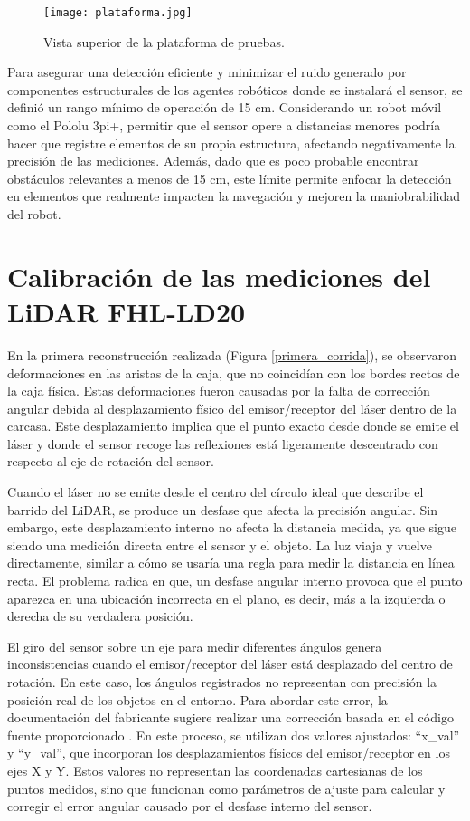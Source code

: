 \begin{figure}[H]
	\centering
	\texttt{[image: plataforma.jpg]}
	\caption{Vista superior de la plataforma de pruebas.}
	\label{fig:plataforma_fisica}
\end{figure}

Para asegurar una detección eficiente y minimizar el ruido generado por componentes estructurales de los agentes robóticos donde se instalará el sensor, se definió un rango mínimo de operación de 15 cm. Considerando un robot móvil como el Pololu 3pi+, permitir que el sensor opere a distancias menores podría hacer que registre elementos de su propia estructura, afectando negativamente la precisión de las mediciones. Además, dado que es poco probable encontrar obstáculos relevantes a menos de 15 cm, este límite permite enfocar la detección en elementos que realmente impacten la navegación y mejoren la maniobrabilidad del robot.

\section{Calibración de las mediciones del LiDAR FHL-LD20}
\label{sec:calibracion}

En la primera reconstrucción realizada (Figura \ref{primera_corrida}), se observaron deformaciones en las aristas de la caja, que no coincidían con los bordes rectos de la caja física. Estas deformaciones fueron causadas por la falta de corrección angular debida al desplazamiento físico del emisor/receptor del láser dentro de la carcasa. Este desplazamiento implica que el punto exacto desde donde se emite el láser y donde el sensor recoge las reflexiones está ligeramente descentrado con respecto al eje de rotación del sensor.

Cuando el láser no se emite desde el centro del círculo ideal que describe el barrido del LiDAR, se produce un desfase que afecta la precisión angular. Sin embargo, este desplazamiento interno no afecta la distancia medida, ya que sigue siendo una medición directa entre el sensor y el objeto. La luz viaja y vuelve directamente, similar a cómo se usaría una regla para medir la distancia en línea recta. El problema radica en que, un desfase angular interno provoca que el punto aparezca en una ubicación incorrecta en el plano, es decir, más a la izquierda o derecha de su verdadera posición.

El giro del sensor sobre un eje para medir diferentes ángulos genera inconsistencias cuando el emisor/receptor del láser está desplazado del centro de rotación. En este caso, los ángulos registrados no representan con precisión la posición real de los objetos en el entorno. Para abordar este error, la documentación del fabricante sugiere realizar una corrección basada en el código fuente proporcionado \cite{youyeetoo_tech_ld20_nodate}. En este proceso, se utilizan dos valores ajustados:  ``x\_val'' y ``y\_val'', que incorporan los desplazamientos físicos del emisor/receptor en los ejes X y Y. Estos valores no representan las coordenadas cartesianas de los puntos medidos, sino que funcionan como parámetros de ajuste para calcular y corregir el error angular causado por el desfase interno del sensor.

